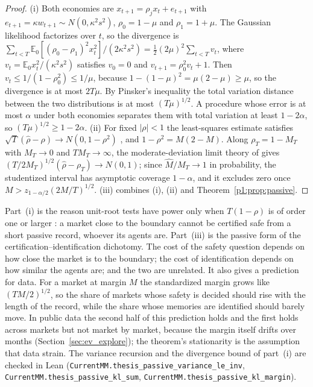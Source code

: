 \begin{proof}
(i) Both economies are $x_{t+1}=\rho_jx_t+e_{t+1}$ with $e_{t+1}=\kappa w_{t+1}\sim N(0,\kappa^2s^2)$, $\rho_0=1-\mu$ and $\rho_1=1+\mu$. The Gaussian likelihood factorizes over $t$, so the divergence is $\sum_{t<T}\mathbb E_0[(\rho_0-\rho_1)^2x_t^2]/(2\kappa^2s^2)=\tfrac12(2\mu)^2\sum_{t<T}v_t$, where $v_t=\mathbb E_0x_t^2/(\kappa^2s^2)$ satisfies $v_0=0$ and $v_{t+1}=\rho_0^2v_t+1$. Then $v_t\le1/(1-\rho_0^2)\le1/\mu$, because $1-(1-\mu)^2=\mu(2-\mu)\ge\mu$, so the divergence is at most $2T\mu$. By Pinsker's inequality the total variation distance between the two distributions is at most $(T\mu)^{1/2}$. A procedure whose error is at most $\alpha$ under both economies separates them with total variation at least $1-2\alpha$, so $(T\mu)^{1/2}\ge1-2\alpha$. (ii) For fixed $|\rho|<1$ the least-squares estimate satisfies $\sqrt T(\hat\rho-\rho)\to N(0,1-\rho^2)$ \citep{t:mannwald1943}, and $1-\rho^2=M(2-M)$. Along $\rho_T=1-M_T$ with $M_T\to0$ and $TM_T\to\infty$, the moderate-deviation limit theory of \citet{t:phillips2007} gives $(T/2M_T)^{1/2}(\hat\rho-\rho_T)\to N(0,1)$; since $\hat M/M_T\to1$ in probability, the studentized interval has asymptotic coverage $1-\alpha$, and it excludes zero once $M>z_{1-\alpha/2}(2M/T)^{1/2}$. (iii) combines (i), (ii) and Theorem~\ref{p1:prop:passive}.
\end{proof}

Part~(i) is the reason unit-root tests have power only when $T(1-\rho)$ is of order one or larger \citep{t:ers1996}: a market close to the boundary cannot be certified safe from a short passive record, whoever its agents are. Part~(iii) is the passive form of the certification--identification dichotomy. The cost of the safety question depends on how close the market is to the boundary; the cost of identification depends on how similar the agents are; and the two are unrelated. It also gives a prediction for data. For a market at margin $M$ the standardized margin grows like $(TM/2)^{1/2}$, so the share of markets whose safety is decided should rise with the length of the record, while the share whose memories are identified should barely move. In public data the second half of this prediction holds and the first holds across markets but not market by market, because the margin itself drifts over months (Section~\ref{sec:ev_explore}); the theorem's stationarity is the assumption that data strain. The variance recursion and the divergence bound of part~(i) are checked in Lean (\nolinkurl{CurrentMM.thesis_passive_variance_le_inv}, \nolinkurl{CurrentMM.thesis_passive_kl_sum}, \nolinkurl{CurrentMM.thesis_passive_kl_margin}).

